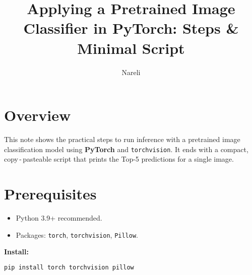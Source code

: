 \documentclass[11pt,a4paper]{article}
\title{Applying a Pretrained Image Classifier in PyTorch: Steps \& Minimal Script}
\author{Nareli}
\date{}
\begin{document}
\maketitle

\section*{Overview}
This note shows the practical steps to run inference with a pretrained image classification model using \textbf{PyTorch} and \texttt{torchvision}. It ends with a compact, copy\,-\,pasteable script that prints the Top-5 predictions for a single image.

\section*{Prerequisites}
\begin{itemize}[leftmargin=1.3em]
  \item Python 3.9+ recommended.
  \item Packages: \texttt{torch}, \texttt{torchvision}, \texttt{Pillow}.
\end{itemize}

\noindent\textbf{Install:}
\begin{lstlisting}[language=bash,style=code]
pip install torch torchvision pillow
\end{lstlisting}
\end{document}
